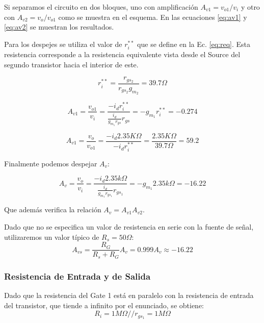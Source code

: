 \documentclass[a4paper, 10pt, spanish]{article}
\begin{document}
Si separamos el circuito en dos bloques, uno con amplificación $A_{v1}=v_{o1}/v_i$ y otro con $A_{v2}=v_o/v_{o1}$ como se muestra en el esquema. En las ecuaciones \ref{eq:av1} y \ref{eq:av2} se muestran los resultados.

Para los despejes se utiliza el valor de $r_i^{**}$ que se define en la Ec. \ref{eq:req}. Esta resistencia corresponde a la resistencia equivalente vista desde el Source del segundo transistor hacia el interior de este.

\begin{equation}
  r_i^{**}=\frac{r_{gs_2}}{r_{gs_2} g_{m_2}} = 39.7 \Omega
  \label{eq:req}
\end{equation}

\begin{equation}
  A_{v1}=\frac{v_{o1}}{v_i}=\frac{-i_d r_i^{**}}{\frac{i_d}{g_{m_1} r_{gs}}r_{gs}}=-g_{m_1} r_i^{**} = -0.274
  \label{eq:av1}
\end{equation}

\begin{equation}
  A_{v1}=\frac{v_{o}}{v_{o1}}=\frac{-i_d 2.35K\Omega}{-i_d r_i^{**}}=\frac{2.35K\Omega}{39.7\Omega} = 59.2
  \label{eq:av2}
\end{equation}

Finalmente podemos despejar $A_v$:

\begin{equation}
  A_v=\frac{v_o}{v_i}=\frac{-i_d 2.35k\Omega}{\frac{i_d}{ g_{m_1} r_{gs_1} } r_{gs_1} } = -g_{m_1} 2.35k\Omega = -16.22
  \label{eq:av}
\end{equation}

Que además verifica la relación $A_v = A_{v1} A_{v2}$.

Dado que no se especifica un valor de resistencia en serie con la fuente de señal, utilizaremos un valor típico de $R_s=50\Omega$:
\begin{equation}
  A_{vs}=\frac{R_G}{R_s+R_G}A_{v} = 0.999 A_v \approx -16.22
\end{equation}


\subsubsection{Resistencia de Entrada y de Salida}
Dado que la resistencia del Gate 1 está en paralelo con la resistencia de entrada del transistor, que tiende a infinito por el enunciado, se obtiene:
\begin{equation}
  R_i=1M\Omega // r_{gs_1} = 1M\Omega
\end{equation}
\end{document}
